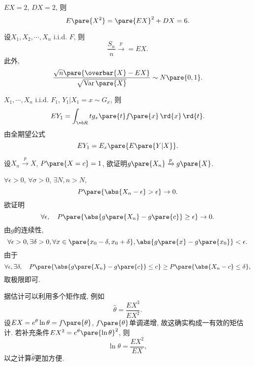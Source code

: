 \documentclass{ctexart}
\DeclareMathOperator{\Var}{Var}
\begin{document}
\begin{sample}
    \begin{ex}
        $EX = 2$, $DX = 2$, 则
        \[ E\pare{X^2} = \pare{EX}^2 + DX = 6. \]
    \end{ex}
\end{sample}
    \begin{theorem}
        设$X_1,X_2,\cdots,X_n$ i.i.d. $F$, 则
        \[ \frac{S_n}{n} \xrightarrow{p} = EX. \]
        此外,
        \[ \frac{\sqrt{n}\pare{\overbar{X} - EX}}{\sqrt{\Var\pare{X}}} \sim N\pare{0,1}. \]
    \end{theorem}
\begin{sample}
    \begin{ex}
        $X_1,\cdots,X_n$ i.i.d. $F_1$, $Y_1\vert X_1 = x \sim G_x$, 则
        \[ EY_1 = \int_{\+bR}tg_x\pare{t}f\pare{x}\,\rd{x}\,\rd{t}. \]
        由全期望公式
        \[ EY_1 = E_x\pare{E\pare{Y\vert X}}. \]
    \end{ex}
\end{sample}
\begin{sample}
    \begin{ex}
        设$X_n\xrightarrow{p} X$, $P\pare{X=c} = 1$, 欲证明$g\pare{X_n}\xrightarrow{p} g\pare{X}$.
    \end{ex}
    \begin{solution}
        $\forall \epsilon>0$, $\forall \sigma>0$, $\exists N, n>N$,
        \[ P\pare{\abs{X_n - \epsilon} > \epsilon} \rightarrow 0. \]
        欲证明
        \[ \forall \epsilon, \quad P\pare{\abs{g\pare{X_n} - g\pare{c}} \ge \epsilon} \rightarrow 0. \]
        由$g$的连续性,
        \[ \forall \epsilon>0, \exists \delta > 0, \forall x\in\pare{x_0 - \delta,x_0 + \delta}, \abs{g\pare{x} - g\pare{x_0}} < \epsilon. \]
        由于
        \[ \forall \epsilon, \exists \delta,\quad P\pare{\abs{g\pare{X_n} - g\pare{c}}\le c} \ge P\pare{\abs{X_n-c}\le \delta}, \]
        取极限即可.
    \end{solution}
\end{sample}
据估计可以利用多个矩作成, 例如
\[ \hat\theta = \frac{EX^3}{EX^2}. \]
设$EX = e^\theta \ln\theta = f\pare{\theta}$, $f\pare{\theta}$单调递增, 故这确实构成一有效的矩估计. 若补充条件$EX^2 = e^\theta \pare{\ln\theta}^2$, 则
\[ \ln \theta = \frac{EX^2}{EX}, \]
以之计算$\hat\theta$更加方便.
\end{document}
